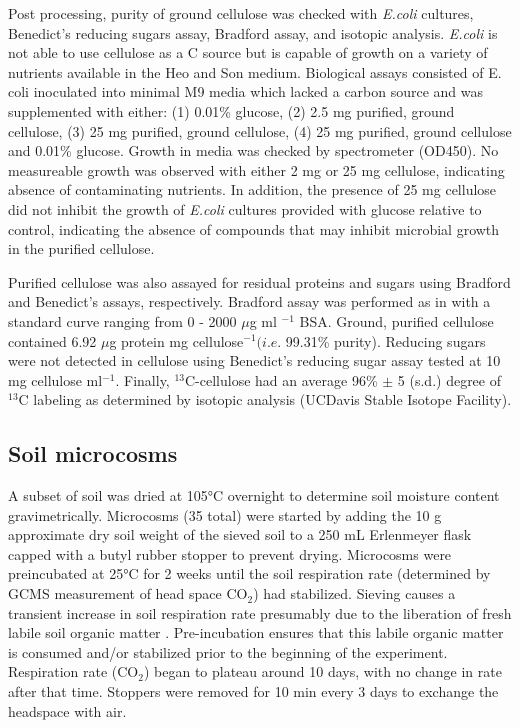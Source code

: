 \documentclass{article}
\begin{document}
Post processing, purity of ground cellulose was checked with \textit{E.coli}
cultures, Benedict's reducing sugars assay, Bradford assay, and isotopic
analysis. \textit{E.coli} is not able to use cellulose as a C source but is
capable of growth on a variety of nutrients available in the Heo and Son
medium.  Biological assays consisted of E. coli inoculated into minimal M9
media which lacked a carbon source and was supplemented with either: (1) 0.01\%
glucose, (2) 2.5 mg purified, ground cellulose, (3) 25 mg purified, ground
cellulose, (4) 25 mg purified, ground cellulose and 0.01\% glucose. Growth in
media was checked by spectrometer (OD450). No measureable growth was observed
with either 2 mg or 25 mg cellulose, indicating absence of contaminating
nutrients. In addition, the presence of 25 mg cellulose did not inhibit the
growth of \textit{E.coli} cultures provided with glucose relative to control,
indicating the absence of compounds that may inhibit microbial growth in the
purified cellulose. 

Purified cellulose was also assayed for residual proteins and sugars using
Bradford and Benedict's assays, respectively. Bradford assay was performed as
in \citep{Bradford_1976} with a standard curve ranging from 0 - 2000
$\mu$g ml $^{-1}$ BSA. Ground, purified cellulose contained 6.92
$\mu$g protein mg cellulose$^{-1} (\textit{i.e.}$ 99.31\% purity).
Reducing sugars were not detected in cellulose using Benedict's reducing sugar
assay \citep{benedict1909reagent} tested at 10 mg cellulose
ml$^{-1}$. Finally, $^{13}$C-cellulose had an average
96\% $\pm$ 5 (s.d.) degree of $^{13}$C labeling as determined by
isotopic analysis (UCDavis Stable Isotope Facility).           

\subsection{Soil microcosms}
A subset of soil was dried at 105°C overnight to determine soil moisture
content gravimetrically. Microcosms (35 total) were started by adding the
10 g approximate dry soil weight of the sieved soil to a 250 mL
Erlenmeyer flask capped with a butyl rubber stopper to prevent drying.
Microcosms were preincubated at 25°C for 2 weeks until the soil respiration
rate (determined by GCMS measurement of head space CO$_{2}$) had stabilized.
Sieving causes a transient increase in soil respiration rate presumably due to
the liberation of fresh labile soil organic matter \citep{Datta_2014}.
Pre-incubation ensures that this labile organic matter is consumed and/or
stabilized prior to the beginning of the experiment. Respiration rate
(CO$_{2}$) began to plateau around 10 days, with no change in rate after that
time. Stoppers were removed for 10 min every 3 days to exchange the headspace
with air. 
\end{document}
